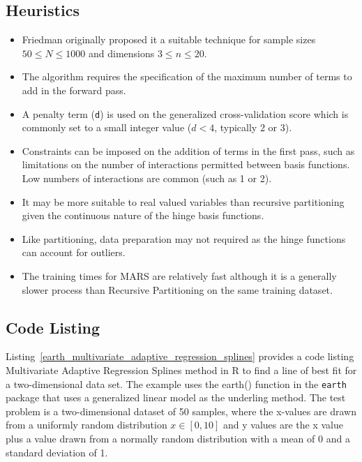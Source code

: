 \subsection{Heuristics}

\begin{itemize}
	\item Friedman originally proposed it a suitable technique for sample sizes $50 \leq N \leq 1000$ and dimensions $3 \leq n \leq 20$.
	\item The algorithm requires the specification of the maximum number of terms to add in the forward pass. %
	\item A penalty term (\texttt{d}) is used on the generalized cross-validation score which is commonly set to a small integer value ($d<4$, typically 2 or 3).
	\item Constraints can be imposed on the addition of terms in the first pass, such as limitations on the number of interactions permitted between basis functions. Low numbers of interactions are common (such as 1 or 2).
	\item It may be more suitable to real valued variables than recursive partitioning given the continuous nature of the hinge basis functions.
	\item Like partitioning, data preparation may not required as the hinge functions can account for outliers.
	\item The training times for MARS are relatively fast although it is a generally slower process than Recursive Partitioning on the same training dataset.
\end{itemize}

\subsection{Code Listing}
Listing~\ref{earth_multivariate_adaptive_regression_splines} provides a code listing Multivariate Adaptive Regression Splines method in R to find a line of best fit for a two-dimensional data set.
The example uses the {earth()} function in the \texttt{earth} package that uses a generalized linear model as the underling method.
The test problem is a two-dimensional dataset of 50 samples, where the x-values are drawn from a uniformly random distribution $x \in [0,10]$ and y values are the x value plus a value drawn from a normally random distribution with a mean of 0 and a standard deviation of 1.

